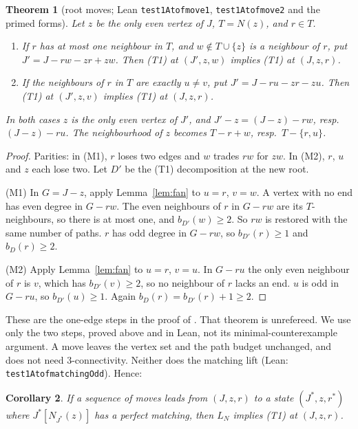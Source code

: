 \documentclass[11pt]{amsart}
\newtheorem{theorem}{Theorem}[section]
\newtheorem{corollary}[theorem]{Corollary}
\theoremstyle{definition}
\theoremstyle{remark}
\renewcommand{\_}{\oldunderscore\allowbreak}
\newcommand{\lean}[1]{\textup{(Lean: {\small\texttt{#1}})}}
\begin{document}
\begin{theorem}[root moves; Lean \texttt{test1At\_of\_move1}, \texttt{test1At\_of\_move2} and the
primed forms]\label{thm:moves}
Let $z$ be the only even vertex of $J$, $T=N(z)$, and $r\in T$.
\begin{enumerate}[label=(M\arabic*)]
\item If $r$ has at most one neighbour in $T$, and $w\notin T\cup\{z\}$ is a neighbour of $r$, put
$J'=J-rw-zr+zw$. Then (T1) at $(J',z,w)$ implies (T1) at $(J,z,r)$.
\item If the neighbours of $r$ in $T$ are exactly $u\ne v$, put $J'=J-ru-zr-zu$. Then (T1) at
$(J',z,v)$ implies (T1) at $(J,z,r)$.
\end{enumerate}
In both cases $z$ is the only even vertex of $J'$, and $J'-z=(J-z)-rw$, resp.\ $(J-z)-ru$. The
neighbourhood of $z$ becomes $T-r+w$, resp.\ $T-\{r,u\}$.
\end{theorem}

\begin{proof}
Parities: in (M1), $r$ loses two edges and $w$ trades $rw$ for $zw$. In (M2), $r$, $u$ and $z$
each lose two. Let $D'$ be the (T1) decomposition at the new root.

(M1) In $G=J-z$, apply Lemma~\ref{lem:fan} to $u=r$, $v=w$. A vertex with no end has even degree in
$G-rw$. The even neighbours of $r$ in $G-rw$ are its $T$-neighbours, so there is at most one, and
$b_{D'}(w)\ge2$. So $rw$ is restored with the same number of paths. $r$ has odd degree in $G-rw$,
so $b_{D'}(r)\ge1$ and $b_D(r)\ge2$.

(M2) Apply Lemma~\ref{lem:fan} to $u=r$, $v=u$. In $G-ru$ the only even neighbour of $r$ is $v$,
which has $b_{D'}(v)\ge2$, so no neighbour of $r$ lacks an end. $u$ is odd in $G-ru$, so
$b_{D'}(u)\ge1$. Again $b_D(r)=b_{D'}(r)+1\ge2$.
\end{proof}

These are the one-edge steps in the proof of \cite[Theorem~145]{MR}. That theorem is unrefereed. We
use only the two steps, proved above and in Lean, not its minimal-counterexample argument. A move
leaves the vertex set and the path budget unchanged, and does not need $3$-connectivity. Neither does
the matching lift \lean{test1At\_of\_matchingOdd}. Hence:

\begin{corollary}\label{cor:moves}
If a sequence of moves leads from $(J,z,r)$ to a state $(J^*,z,r^*)$ where $J^*[N_{J^*}(z)]$ has a
perfect matching, then $L_N$ implies (T1) at $(J,z,r)$.
\end{corollary}
\end{document}
